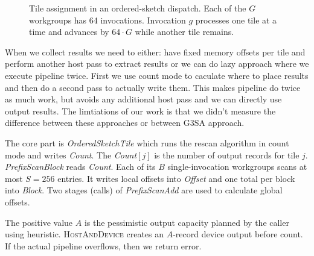 \begin{figure}[H]
\caption{Tile assignment in an ordered-sketch dispatch.  Each of the $G$
workgroups has 64 invocations.  Invocation $g$ processes one tile at a time
and advances by $64\mathbin{\cdot}G$ while another tile remains.}
\label{fig:vulkan-tile-dispatch}
\end{figure}

When we collect results we need to either: have fixed memory offsets per tile and perform another host pass to extract results or we can do lazy approach where we execute pipeline twice. First we use count mode to caculate where to place results and then 
do a second pass to actually write them. This makes pipeline do twice as much work, but avoids any additional host pass and we can directly use output results. 
The limtiations of our work is that we didn't measure the difference between these approaches or between G3SA approach.

The core part is \emph{OrderedSketchTile} which runs the rescan algorithm in count mode and writes \emph{Count}.
The \emph{Count}$[j]$ is the number of output records for
tile $j$. \emph{PrefixScanBlock} reads \emph{Count}.  Each of its $B$
single-invocation workgroups scans at most $S=256$ entries.  It writes
local offsets into \emph{Offset} and one total per block into \emph{Block}.
Two stages (calls) of \emph{PrefixScanAdd} are used to calculate global offsets.

The positive value $A$ is the pessimistic output capacity planned by
the caller using heuristic. \textsc{HostAndDevice} creates an $A$-record device output before count. If the actual pipeline overflows, then we return error.

